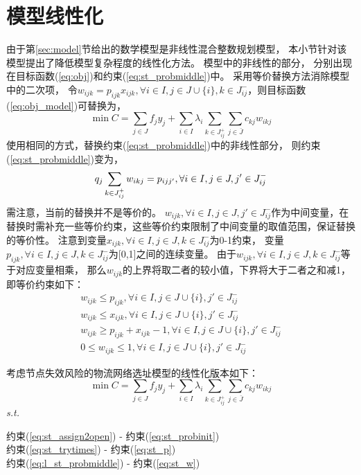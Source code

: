 \section{模型线性化}
\label{sec:线性化}
由于第\ref{sec:model}节给出的数学模型是非线性混合整数规划模型，
本小节针对该模型提出了降低模型复杂程度的线性化方法。
模型中的非线性的部分，
分别出现在目标函数(\ref{eq:obj})和约束(\ref{eq:st_probmiddle})中。
采用等价替换方法消除模型中的二次项，
令$w_{ijk} = p_{ijk}x_{ijk},\forall i \in I, j \in J\cup \{i\}, k\in J_{ij}^-$，则目标函数(\ref{eq:obj_model})可替换为，
\begin{equation}
\min C = \sum_{j\in J}f_jy_j + \sum_{i\in I}\lambda_i \sum_{k\in J_{ij}^+}\sum_{j\in \bar{J}} c_{kj} w_{ikj}
\end{equation}
使用相同的方式，替换约束(\ref{eq:st_probmiddle})中的非线性部分，
则约束(\ref{eq:st_probmiddle})变为，
\begin{equation}
q_j\sum_{k\in J_{ij}^+} w_{ikj}= p_{ijj'}, \forall i \in I, j \in J, j'\in J_{ij}^- \label{eq:l_st_probmiddle} \\
\end{equation}
需注意，当前的替换并不是等价的。
$w_{ijk}, \forall i \in I, j \in J, j'\in J_{ij}^-$作为中间变量，在替换时需补充一些等价约束，这些等价约束限制了中间变量的取值范围，保证替换的等价性。
注意到变量$x_{ijk},\forall i \in I, j \in J, k\in J_{ij}^-$为0-1约束，
变量$p_{ijk},\forall i \in I, j \in J, k\in J_{ij}^-$为[0,1]之间的连续变量。
由于$w_{ijk},\forall i \in I, j \in J, k\in J_{ij}^-$等于对应变量相乘，
那么$w_{ijk}$的上界将取二者的较小值，下界将大于二者之和减1，即等价约束如下：
\begin{gather}
w_{ijk} \le p_{ijk}, \forall i \in I, j \in J \cup \{i\}, j'\in J_{ij}^- \\
w_{ijk} \le x_{ijk}, \forall i \in I, j \in J \cup \{i\}, j'\in J_{ij}^- \\
w_{ijk} \ge p_{ijk} + x_{ijk} - 1, \forall i \in I, j \in J \cup \{i\}, j'\in J_{ij}^-\\
0 \le w_{ijk} \le 1, \forall i \in I, j \in J \cup \{i\}, j'\in J_{ij}^- \label{eq:st_w}
\end{gather}

考虑节点失效风险的物流网络选址模型的线性化版本如下：
\begin{equation}
\label{eq:l_obj_model}
\min C = \sum_{j\in J}f_jy_j + \sum_{i\in I}\lambda_i \sum_{k\in J_{ij}^+}\sum_{j\in \bar{J}} c_{kj} w_{ikj}
\end{equation}
\textit{s.t.}
\begin{center}
    约束(\ref{eq:st_assign2open}) - 约束(\ref{eq:st_probinit}) \\
    约束(\ref{eq:st_trytimes}) - 约束(\ref{eq:st_p}) \\
    约束(\ref{eq:l_st_probmiddle}) - 约束(\ref{eq:st_w})
\end{center}

